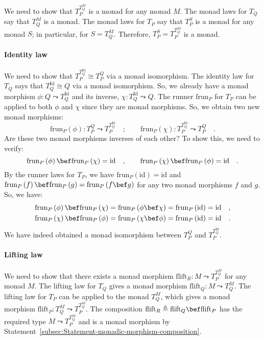 We need to show that $T_{P}^{T_{Q}^{M}}$ is a monad for any monad
$M$. The monad laws for $T_{Q}$ say that $T_{Q}^{M}$ is a monad.
The monad laws for $T_{P}$ say that $T_{P}^{S}$ is a monad for any
monad $S$; in particular, for $S=T_{Q}^{M}$. Therefore, $T_{P}^{S}=T_{P}^{T_{Q}^{M}}$
is a monad.

\paragraph{Identity law}

We need to show that $T_{P}^{T_{Q}^{\text{Id}}}\cong T_{P}^{Q}$ via
a monad isomorphism. The identity law for $T_{Q}$ says that $T_{Q}^{\text{Id}}\cong Q$
via a monad isomorphism. So, we already have a monad morphism $\phi:Q\leadsto T_{Q}^{\text{Id}}$
and its inverse, $\chi:T_{Q}^{\text{Id}}\leadsto Q$. The runner $\text{frun}_{P}$
for $T_{P}$ can be applied to both $\phi$ and $\chi$ since they
are monad morphisms. So, we obtain two new monad morphisms:
\[
\text{frun}_{P}\left(\phi\right):T_{P}^{Q}\leadsto T_{P}^{T_{Q}^{\text{Id}}}\quad;\quad\quad\text{frun}_{P}\left(\chi\right):T_{P}^{T_{Q}^{\text{Id}}}\leadsto T_{P}^{Q}\quad.
\]
Are these two monad morphisms inverses of each other? To show this,
we need to verify:
\[
\text{frun}_{P}\left(\phi\right)\bef\text{frun}_{P}\left(\chi\right)=\text{id}\quad,\quad\quad\text{frun}_{P}\left(\chi\right)\bef\text{frun}_{P}\left(\phi\right)=\text{id}\quad.
\]
By the runner laws for $T_{P}$, we have $\text{frun}_{P}\left(\text{id}\right)=\text{id}$
and $\text{frun}_{P}\left(f\right)\bef\text{frun}_{P}\left(g\right)=\text{frun}_{P}\left(f\bef g\right)$
for any two monad morphisms $f$ and $g$. So, we have:
\begin{align*}
\text{frun}_{P}\left(\phi\right)\bef\text{frun}_{P}\left(\chi\right) & =\text{frun}_{P}\left(\phi\bef\chi\right)=\text{frun}_{P}\left(\text{id}\right)=\text{id}\quad,\\
\text{frun}_{P}\left(\chi\right)\bef\text{frun}_{P}\left(\phi\right) & =\text{frun}_{P}\left(\chi\bef\phi\right)=\text{frun}_{P}\left(\text{id}\right)=\text{id}\quad.
\end{align*}
We have indeed obtained a monad isomorphism between $T_{P}^{Q}$ and
$T_{P}^{T_{Q}^{\text{Id}}}$.

\paragraph{Lifting law}

We need to show that there exists a monad morphism $\text{flift}_{R}:M\leadsto T_{P}^{T_{Q}^{M}}$
for any monad $M$. The lifting law for $T_{Q}$ gives a monad morphism
$\text{flift}_{Q}:M\leadsto T_{Q}^{M}$. The lifting law for $T_{P}$
can be applied to the monad $T_{Q}^{M}$, which gives a monad morphism
$\text{flift}_{P}:T_{Q}^{M}\leadsto T_{P}^{T_{Q}^{M}}$. The composition
$\text{flift}_{R}\triangleq\text{flift}_{Q}\bef\text{flift}_{P}$
has the required type $M\leadsto T_{P}^{T_{Q}^{M}}$ and is a monad
morphism by Statement~\ref{subsec:Statement-monadic-morphism-composition}.

